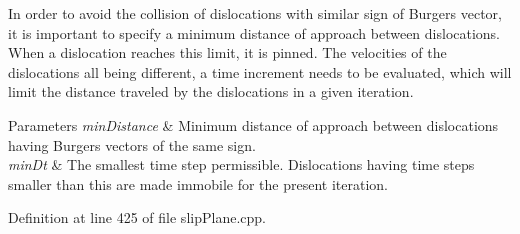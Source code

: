 In order to avoid the collision of dislocations with similar sign of Burgers vector, it is important to specify a minimum distance of approach between dislocations. When a dislocation reaches this limit, it is pinned. The velocities of the dislocations all being different, a time increment needs to be evaluated, which will limit the distance traveled by the dislocations in a given iteration. 
\begin{DoxyParams}{Parameters}
{\em min\-Distance} & Minimum distance of approach between dislocations having Burgers vectors of the same sign. \\
\hline
{\em min\-Dt} & The smallest time step permissible. Dislocations having time steps smaller than this are made immobile for the present iteration. \\
\hline
\end{DoxyParams}


Definition at line 425 of file slip\-Plane.\-cpp.


